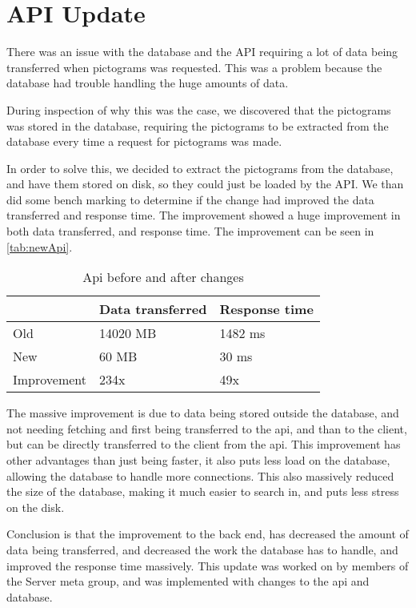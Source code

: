 \section{API Update}
There was an issue with the database and the API requiring a lot of data being transferred when pictograms was requested. This was a problem because the database had trouble handling the huge amounts of data. 

During inspection of why this was the case, we discovered that the pictograms was stored in the database, requiring the pictograms to be extracted from the database every time a request for pictograms was made. 

In order to solve this, we decided to extract the pictograms from the database, and have them stored on disk, so they could just be loaded by the API. We than did some bench marking to determine if the change had improved the data transferred and response time. The improvement showed a huge improvement in both data transferred, and response time. The improvement can be seen in \autoref{tab:newApi}.

\begin{table}[H]
    \centering
    \begin{tabular}{|l|l|l|}
    \hline
                    & Data transferred  & Response time \\ \hline
        Old         & 14020 MB          & 1482 ms       \\ \hline 
        New         & 60 MB             & 30 ms         \\ \hline
        Improvement & 234x              & 49x           \\ \hline
    \end{tabular}
    \caption{Api before and after changes}
    \label{tab:newApi}
\end{table}

The massive improvement is due to data being stored outside the database, and not needing fetching and first being transferred to the api, and than to the client, but can be directly transferred to the client from the api. This improvement has other advantages than just being faster, it also puts less load on the database, allowing the database to handle more connections. This also massively reduced the size of the database, making it much easier to search in, and puts less stress on the disk.

Conclusion is that the improvement to the back end, has decreased the amount of data being transferred, and decreased the work the database has to handle, and improved the response time massively. This update was worked on by members of the Server meta group, and was implemented with changes to the api and database. 